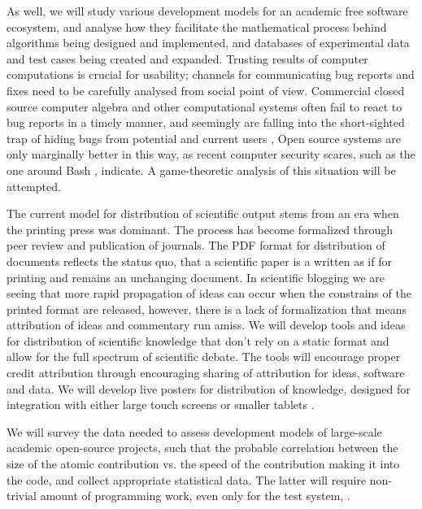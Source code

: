 \begin{workpackage}[id=social-aspects,wphases=0-48,
  title=Social Aspects,
  lead=UO,
  UORM=53,USHRM=8, USORM=5]
\begin{wpdescription}
As well, we will study various development models for an academic free
software ecosystem, and analyse how they facilitate the mathematical
process behind algorithms being designed and implemented, and
databases of experimental data and test cases being created and
expanded.  Trusting results of computer computations is crucial for
usability; channels for communicating bug reports and fixes need to be
carefully analysed from social point of view.  Commercial closed
source computer algebra and other computational systems often fail to
react to bug reports in a timely manner, and seemingly are falling
into the short-sighted trap of hiding bugs from potential and current
users \cite{misfort}, Open source systems are only marginally better
in this way, as recent computer security scares, such as the one
around Bash \cite{shellshock}, indicate.  A game-theoretic analysis of
this situation will be attempted.
\end{wpdescription}

\begin{tasklist}
\begin{task}[title=Modern Distribution of Scientific Output]
   The current model for distribution of scientific output
  stems from an era when the printing press was dominant. The process has become
  formalized through peer review and publication of journals. The PDF format for
  distribution of documents reflects the status quo, that a scientific paper is a written
  as if for printing and remains an unchanging document. In scientific blogging we are
  seeing that more rapid propagation of ideas can occur when the constrains of the printed
  format are released, however, there is a lack of formalization that means attribution of
  ideas and commentary run amiss. We will develop tools and ideas for distribution of
  scientific knowledge that don't rely on a static format and allow for the full spectrum
  of scientific debate. The tools will encourage proper credit attribution through
  encouraging sharing of attribution for ideas, software and data. We will develop live
  posters for distribution of knowledge, designed for integration with either large touch
  screens or smaller tablets .
\end{task}

\begin{task}[title=Survey and collection of needed data,id=datacollection]
We will survey the data needed to assess development models of
large-scale academic open-source projects,
such that the probable correlation between the size of the atomic contribution
vs. the speed of the contribution making it into the code,
and collect appropriate statistical data. The latter will require non-trivial
amount of programming work, even only for the test system, \Sage.
\end{task}


\end{tasklist}
\end{workpackage}
